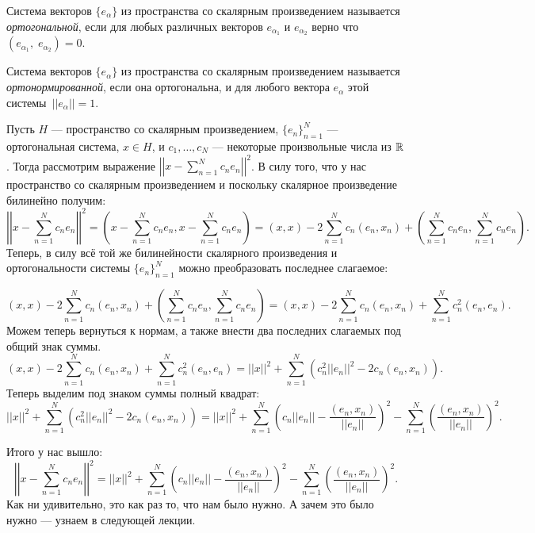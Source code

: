 \begin{Def}
    Система векторов $\{e_\alpha\}$ из пространства со скалярным произведением называется \textit{ортогональной}, если для любых различных векторов $e_{\alpha_1}$ и $e_{\alpha_2}$ верно что $(e_{\alpha_1},\;e_{\alpha_2}) = 0$.
\end{Def}


\begin{Def}
    Система векторов $\{e_\alpha\}$ из пространства со скалярным произведением называется \textit{ортонормированной}, если она ортогональна, и для любого вектора $e_{\alpha}$ этой  системы~$||e_{\alpha}||=1$.
\end{Def}

Пусть $H$ --- пространство со скалярным произведением, $\{e_n\}_{n=1}^{N}$ --- ортогональная система, $x \in H$, и $c_1, \ldots, c_N$ --- некоторые произвольные числа из $\mathbb{R}$. Тогда рассмотрим выражение $\left|\left|x - \sum\limits_{n= 1}^{N}c_ne_n\right|\right|^2$. В силу того, что у нас пространство со скалярным произведением и поскольку скалярное произведение билинейно получим:
\[
    \left|\left|x - \sum\limits_{n= 1}^{N}c_ne_n\right|\right|^2 = \left(x - \sum\limits_{n= 1}^{N}c_ne_n, x - \sum\limits_{n= 1}^{N}c_ne_n\right) = (x, x) -2 \sum\limits_{n= 1}^{N}c_n(e_n, x_n) + \left( \sum\limits_{n= 1}^{N}c_ne_n, \sum\limits_{n= 1}^{N}c_ne_n\right).
\]
Теперь, в силу всё той же билинейности скалярного произведения и ортогональности системы $\{e_n\}_{n=1}^{N}$ можно преобразовать последнее слагаемое:

\[
(x, x) -2 \sum\limits_{n= 1}^{N}c_n(e_n, x_n) + \left( \sum\limits_{n= 1}^{N}c_ne_n, \sum\limits_{n= 1}^{N}c_ne_n\right) = (x, x) - 2 \sum\limits_{n= 1}^{N}c_n(e_n, x_n) +  \sum\limits_{n= 1}^{N}c_n^2(e_n, e_n).
\]
Можем теперь вернуться к нормам, а также внести два последних слагаемых под общий знак суммы.
\[
(x, x) - 2 \sum\limits_{n= 1}^{N}c_n(e_n, x_n) +  \sum\limits_{n= 1}^{N}c_n^2(e_n, e_n) = ||x||^2 + \sum\limits_{n= 1}^{N}\left( c_n^2||e_n||^2-2c_n(e_n, x_n)\right).
\]
Теперь выделим под знаком суммы полный квадрат:
\[
||x||^2 + \sum\limits_{n= 1}^{N}\left( c_n^2||e_n||^2-2c_n(e_n, x_n)\right) = ||x||^2 + \sum\limits_{n= 1}^{N}\left( c_n||e_n||-\frac{(e_n, x_n)}{||e_n||}\right)^2 - \sum\limits_{n= 1}^{N}\left(\frac{(e_n, x_n)}{||e_n||}\right)^2.
\]

Итого у нас вышло:
 $$\left|\left|x - \sum\limits_{n= 1}^{N}c_ne_n\right|\right|^2 = ||x||^2 + \sum\limits_{n= 1}^{N}\left( c_n||e_n||-\frac{(e_n, x_n)}{||e_n||}\right)^2 - \sum\limits_{n= 1}^{N}\left(\frac{(e_n, x_n)}{||e_n||}\right)^2.$$
 Как ни удивительно, это как раз то, что нам было нужно. А зачем это было нужно --- узнаем в следующей лекции.